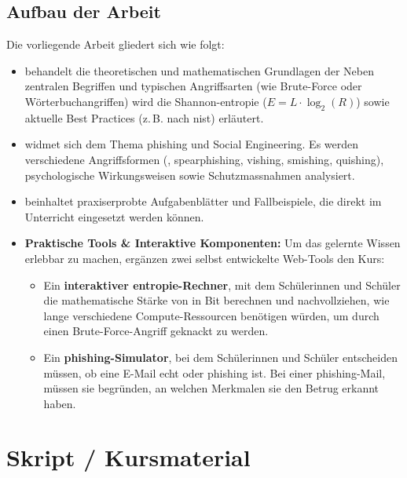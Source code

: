 \documentclass[12pt,a4paper]{article}
\begin{document}
\subsection{Aufbau der Arbeit}
Die vorliegende Arbeit gliedert sich wie folgt:
\begin{itemize}
    \item \textbf{} behandelt die theoretischen und mathematischen Grundlagen der  Neben zentralen Begriffen und typischen Angriffsarten \newline (wie Brute-Force oder Wörterbuchangriffen) wird die Shannon-\gls{entropie} \newline ($E = L \cdot \log_2(R)$) sowie aktuelle Best Practices (z.\,B. nach \gls{nist}) erläutert.
    \item \textbf{} widmet sich dem Thema \gls{phishing} und Social Engineering. \newline Es werden verschiedene Angriffsformen (, \gls{spearphishing}, \gls{vishing}, \mbox{\gls{smishing},} \mbox{\gls{quishing}}), psychologische Wirkungsweisen sowie Schutzmassnahmen \mbox{analysiert.}
    \item \textbf{} beinhaltet praxiserprobte Aufgabenblätter und Fallbeispiele, die direkt im \mbox{Unterricht} eingesetzt werden können.
    \item \textbf{Praktische Tools \& Interaktive Komponenten:} Um das gelernte Wissen \mbox{erlebbar} zu machen, ergänzen zwei selbst entwickelte Web-Tools den Kurs:
    \begin{itemize}
        \item Ein \textbf{interaktiver \gls{entropie}-Rechner}, mit dem Schülerinnen und Schüler die mathematische Stärke von in Bit berechnen und nachvollziehen, wie lange \mbox{verschiedene} Compute-Ressourcen benötigen würden, um durch einen Brute-Force-Angriff geknackt zu werden.
        \item Ein \textbf{\gls{phishing}-Simulator}, bei dem Schülerinnen und Schüler entscheiden \mbox{müssen,} ob eine E-Mail echt oder \gls{phishing} ist. Bei einer \gls{phishing}-Mail, müssen sie begründen, an welchen Merkmalen sie den Betrug erkannt haben.
    \end{itemize}
\end{itemize}

\newpage

\section{Skript / Kursmaterial}
\label{sec:skript}



\newpage
\raggedright
\printbibliography[heading=bibintoc,title={Literaturverzeichnis}]

\vspace{1.5cm}

\printglossary[type=\acronymtype, title=Akronyme]

\newpage
\printglossary[title=Glossar]
\end{document}
